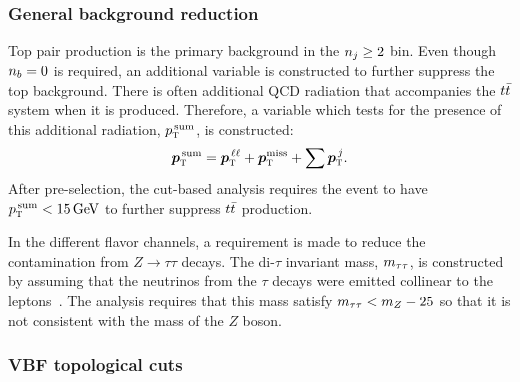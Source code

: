 \subsubsection{General background reduction}

Top pair production is the primary background in the $n_j \geq 2$ bin. Even though $n_b = 0$ is required, an additional variable is constructed to further suppress the top background. There is often additional QCD radiation that accompanies the $t\bar{t}$ system when it is produced. Therefore, a variable which tests for the presence of this additional radiation, $p_{\textrm{\footnotesize\sc t}}^{\,\rm sum}$, is constructed:
%
\begin{equation}
\hbox{\bm{$p$}}_{\textrm{\footnotesize\sc t}}^{\,\rm sum} = \hbox{\bm{$p$}}_{\textrm{\footnotesize\sc t}}^{\,\ell\ell} + \hbox{\bm{$p$}}_{\textrm{\footnotesize\sc t}}^{\rm miss} + \sum \hbox{\bm{$p$}}_{\textrm{\footnotesize\sc t}}^{\,j}.
\label{eqn:pttot}
\end{equation} 
%
After pre-selection, the cut-based analysis requires the event to have $\pTtot < 15 \GeV$ to further suppress $t\bar{t}$ production.  

In the different flavor channels, a requirement is made to reduce the contamination from $Z\to\tau\tau$ decays. The di-$\tau$ invariant mass, $m_{\tau\tau}$, is constructed by assuming that the neutrinos from the $\tau$ decays were emitted collinear to the leptons~\cite{collinear}. The analysis requires that this mass satisfy $m_{\tau\tau} < m_Z - 25$ \GeV so that it is not consistent with the mass of the $Z$ boson. 

\subsubsection{VBF topological cuts}
\label{sec:vbf_topocuts}

